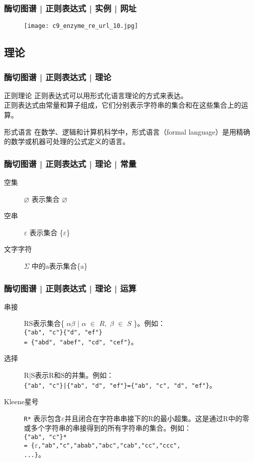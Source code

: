 \begin{frame}
  \frametitle{酶切图谱 | 正则表达式 | 实例 | 网址}
  \begin{figure}
    \centering
    \texttt{[image: c9\_enzyme\_re\_url\_10.jpg]}
  \end{figure}
\end{frame}

\subsection{理论}
\begin{frame}
  \frametitle{酶切图谱 | 正则表达式 | 理论}
  \begin{block}{正则理论}
    正则表达式可以用形式化语言理论的方式来表达。\\
    \vspace{1em}
    \alert{正则表达式由常量和算子组成，它们分别表示字符串的集合和在这些集合上的运算。}
  \end{block}
  \pause
  \begin{block}{形式语言}
    在数学、逻辑和计算机科学中，形式语言（formal language）是用精确的数学或机器可处理的公式定义的语言。
  \end{block}
\end{frame}

\begin{frame}
  \frametitle{酶切图谱 | 正则表达式 | 理论 | 常量}
  \begin{description}
    \item[空集] $\varnothing$ 表示集合 $\varnothing$
    \item[空串] $\varepsilon$ 表示集合 \{$\varepsilon$\}
    \item[文字字符] $\Sigma$ 中的a表示集合\{a\}
  \end{description}
\end{frame}

\begin{frame}[fragile]
  \frametitle{酶切图谱 | 正则表达式 | 理论 | 运算}
  \begin{description}
    \item[串接] RS表示集合\{ $\alpha\beta$ $|$ $\alpha$ $\in$  $R,$ $\beta$ $\in$ $S$ \}。例如：\\ \verb|{"ab", "c"}{"d", "ef"}| \\\verb|= {"abd", "abef", "cd", "cef"}|。
    \item[选择] R|S表示R和S的并集。例如：\\ \verb+{"ab", "c"}|{"ab", "d", "ef"}={"ab", "c", "d", "ef"}+。
    \item[Kleene星号] \verb|R*| 表示包含$\varepsilon$并且闭合在字符串串接下的R的最小超集。这是通过R中的零或多个字符串的串接得到的所有字符串的集合。例如：\\ \verb|{"ab", "c"}*|\\ \verb|= {|$\varepsilon$\verb|,"ab","c","abab","abc","cab","cc","ccc",|\\ \quad \verb|...}|。
  \end{description}
\end{frame}

